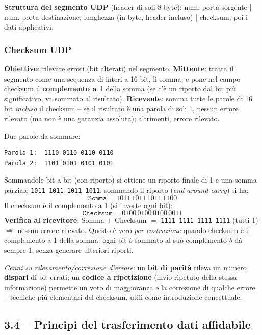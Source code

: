 \documentclass[12pt, a4paper]{article}
\begin{document}
\textbf{Struttura del segmento UDP} (header di soli 8 byte): num. porta sorgente | num. porta destinazione; lunghezza (in byte, header incluso) | checksum; poi i dati applicativi.

\subsubsection{Checksum UDP}

\textbf{Obiettivo}: rilevare errori (bit alterati) nel segmento. \textbf{Mittente}: tratta il segmento come una sequenza di interi a 16 bit, li somma, e pone nel campo checksum il \textbf{complemento a 1} della somma (se c'è un riporto dal bit più significativo, va sommato al risultato). \textbf{Ricevente}: somma tutte le parole di 16 bit \textit{incluso} il checksum -- se il risultato è una parola di soli 1, nessun errore rilevato (ma non è una garanzia assoluta); altrimenti, errore rilevato.

\begin{tcolorbox}[colback=lightergray!10, colframe=tocsec, title=\textbf{Esempio numerico completo}]
Due parole da sommare:
\begin{verbatim}
Parola 1:  1110 0110 0110 0110
Parola 2:  1101 0101 0101 0101
\end{verbatim}
Sommandole bit a bit (con riporto) si ottiene un riporto finale di 1 e una somma parziale \texttt{1011 1011 1011 1011}; sommando il riporto (\textit{end-around carry}) si ha:
$$\texttt{Somma} = 1011\,1011\,1011\,1100$$
Il checksum è il complemento a 1 (si inverte ogni bit):
$$\texttt{Checksum} = 0100\,0100\,0100\,0011$$
\textbf{Verifica al ricevitore}: Somma + Checksum $=$ \texttt{1111 1111 1111 1111} (tutti 1) $\Rightarrow$ nessun errore rilevato. Questo è vero \textit{per costruzione} quando checksum è il complemento a 1 della somma: ogni bit $b$ sommato al suo complemento $\overline{b}$ dà sempre 1, senza generare ulteriori riporti.
\end{tcolorbox}

\textit{Cenni su rilevamento/correzione d'errore}: un \textbf{bit di parità} rileva un numero \textbf{dispari} di bit errati; un \textbf{codice a ripetizione} (invio ripetuto della stessa informazione) permette un voto di maggioranza e la correzione di qualche errore -- tecniche più elementari del checksum, utili come introduzione concettuale.

\subsection{3.4 -- Principi del trasferimento dati affidabile}
\end{document}
